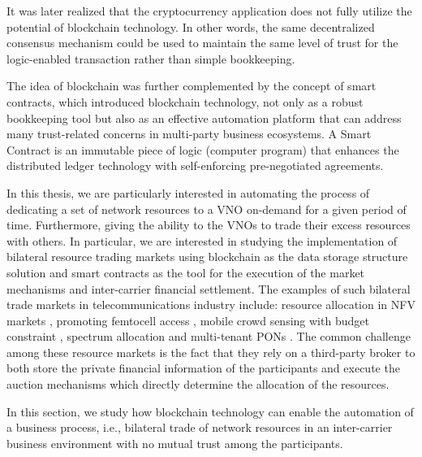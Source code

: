 It was later realized that the cryptocurrency application does not fully utilize the potential of blockchain technology. In other words, the same decentralized consensus mechanism could be used to maintain the same level of trust for the logic-enabled transaction rather than simple bookkeeping. 

The idea of blockchain was further complemented by the concept of smart contracts, which introduced blockchain technology, not only as a robust bookkeeping tool but also as an effective automation platform that can address many trust-related concerns in multi-party business ecosystems. A Smart Contract is an immutable piece of logic (computer program) that enhances the distributed ledger technology with self-enforcing pre-negotiated agreements.

In this thesis, we are particularly interested in automating the process of dedicating a set of network resources to a \ac{VNO} on-demand for a given period of time. Furthermore, giving the ability to the \acp{VNO} to trade their excess resources with others. In particular, we are interested in studying the implementation of bilateral resource trading markets using blockchain as the data storage structure solution and smart contracts as the tool for the execution of the market mechanisms and inter-carrier financial settlement. The examples of such bilateral trade markets in telecommunications industry include: resource allocation in \ac{NFV} markets \cite{8542782}, promoting femtocell access \cite{8665886}, mobile crowd sensing with budget constraint \cite{8664672}, spectrum allocation \cite{8395445} and multi-tenant \acp{PON} \cite{8488596}. The common challenge among these resource markets is the fact that they rely on a third-party broker to both store the private financial information of the participants and execute the auction mechanisms which directly determine the allocation of the resources.

In this section, we study how blockchain technology can enable the automation of a business process, i.e., bilateral trade of network resources in an inter-carrier business environment with no mutual trust among the participants.


